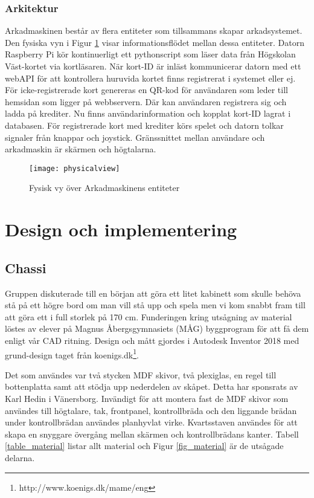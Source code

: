 \documentclass[12pt,fleqn,openany]{book} %
\begin{document}
\subsection{Arkitektur}
Arkadmaskinen består av flera entiteter som tillsammans skapar arkadsystemet. Den fysiska vyn i Figur \ref{fig_physview} visar informationsflödet 
mellan dessa entiteter. Datorn Raspberry Pi kör kontinuerligt ett pythonscript som läser data från Högskolan Väst-kortet via kortläsaren. 
När kort-ID är inläst kommunicerar datorn med ett webAPI för att kontrollera huruvida kortet finns registrerat i systemet eller ej. För 
icke-registrerade kort genereras en QR-kod för användaren som leder till hemsidan som ligger på webbservern. Där kan användaren 
registrera sig och ladda på krediter. Nu finns användarinformation och kopplat kort-ID lagrat i databasen. För registrerade kort med 
krediter körs spelet och datorn tolkar signaler från knappar och joystick. Gränssnittet mellan användare och arkadmaskin är skärmen 
och högtalarna.

\begin{figure}[!h]
\centering\texttt{[image: physicalview]}
\caption{Fysisk vy över Arkadmaskinens entiteter}
\label{fig_physview}
\end{figure}


\chapter{Design och implementering}
\section{Chassi}
Gruppen diskuterade till en början att göra ett litet kabinett som skulle behöva stå på ett högre bord om man vill stå upp och
spela men vi kom snabbt fram till att göra ett i full storlek på 170 cm. Funderingen kring utsågning av material löstes av elever
på Magnus Åbergsgymnasiets (MÅG) byggprogram för att få dem enligt vår CAD ritning. Design och mått gjordes i Autodesk Inventor 
2018 med grund-design taget från koenigs.dk\footnote{http://www.koenigs.dk/mame/eng}.

Det som användes var två stycken MDF skivor, två plexiglas, en regel till bottenplatta samt att stödja upp nederdelen av skåpet. 
Detta har sponsrats av Karl Hedin i Vänersborg. Invändigt för att montera fast de MDF skivor som användes till högtalare, tak, 
frontpanel, kontrollbräda och den liggande brädan under kontrollbrädan användes planhyvlat virke. Kvartsstaven användes för att 
skapa en snyggare övergång mellan skärmen och kontrollbrädans kanter. Tabell \ref{table_material} listar allt material och Figur \ref{fig_material} är de utsågade delarna.
\end{document}
